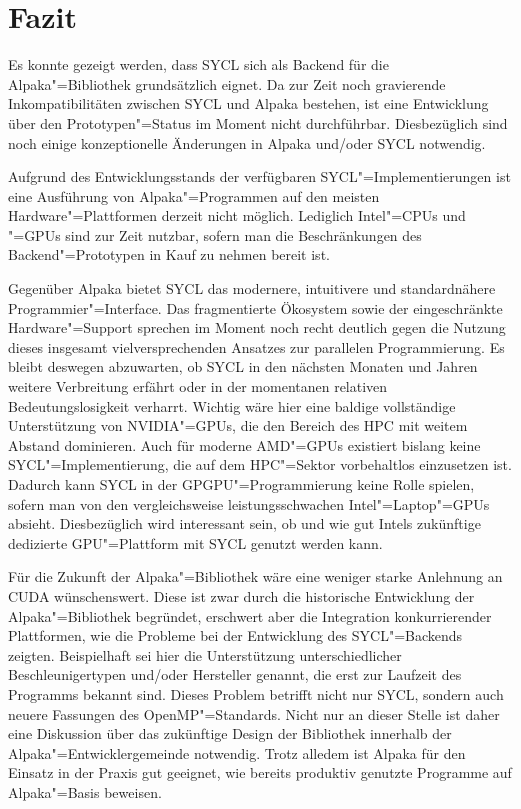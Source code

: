 \chapter{Fazit}
\label{fazit}

Es konnte gezeigt werden, dass SYCL sich als Backend für die Alpaka"=Bibliothek
grundsätzlich eignet. Da zur Zeit noch gravierende Inkompatibilitäten zwischen
SYCL und Alpaka bestehen, ist eine Entwicklung über den Prototypen"=Status
im Moment nicht durchführbar. Diesbezüglich sind noch einige konzeptionelle
Änderungen in Alpaka und/oder SYCL notwendig.

Aufgrund des Entwicklungsstands der verfügbaren SYCL"=Implementierungen ist eine
Ausführung von Alpaka"=Programmen auf den meisten Hardware"=Plattformen derzeit
nicht möglich. Lediglich Intel"=CPUs und "=GPUs sind zur Zeit nutzbar, sofern
man die Beschränkungen des Backend"=Prototypen in Kauf zu nehmen bereit ist.

Gegenüber Alpaka bietet SYCL das modernere, intuitivere und standardnähere
Programmier"=Interface. Das fragmentierte Ökosystem sowie der eingeschränkte
Hardware"=Support sprechen im Moment noch recht deutlich gegen die Nutzung
dieses insgesamt vielversprechenden Ansatzes zur parallelen Programmierung. Es
bleibt deswegen abzuwarten, ob SYCL in den nächsten Monaten und Jahren weitere
Verbreitung erfährt oder in der momentanen relativen Bedeutungslosigkeit
verharrt. Wichtig wäre hier eine baldige vollständige Unterstützung von
NVIDIA"=GPUs, die den Bereich des HPC mit weitem Abstand dominieren. Auch für
moderne AMD"=GPUs existiert bislang keine SYCL"=Implementierung, die auf dem
HPC"=Sektor vorbehaltlos einzusetzen ist. Dadurch kann SYCL in der
GPGPU"=Programmierung keine Rolle spielen, sofern man von den vergleichsweise
leistungsschwachen Intel"=Laptop"=GPUs absieht. Diesbezüglich wird interessant
sein, ob und wie gut Intels zukünftige dedizierte GPU"=Plattform mit SYCL
genutzt werden kann.

Für die Zukunft der Alpaka"=Bibliothek wäre eine weniger starke Anlehnung an
CUDA wünschenswert. Diese ist zwar durch die historische Entwicklung der
Alpaka"=Bibliothek begründet, erschwert aber die Integration konkurrierender
Plattformen, wie die Probleme bei der Entwicklung des SYCL"=Backends zeigten.
Beispielhaft sei hier die Unterstützung unterschiedlicher Beschleunigertypen
und/oder Hersteller genannt, die erst zur Laufzeit des Programms bekannt sind.
Dieses Problem betrifft nicht nur SYCL, sondern auch neuere Fassungen des
OpenMP"=Standards. Nicht nur an dieser Stelle ist daher eine Diskussion über das
zukünftige Design der Bibliothek innerhalb der Alpaka"=Entwicklergemeinde
notwendig. Trotz alledem ist Alpaka für den Einsatz in der Praxis gut geeignet,
wie bereits produktiv genutzte Programme auf Alpaka"=Basis beweisen.

